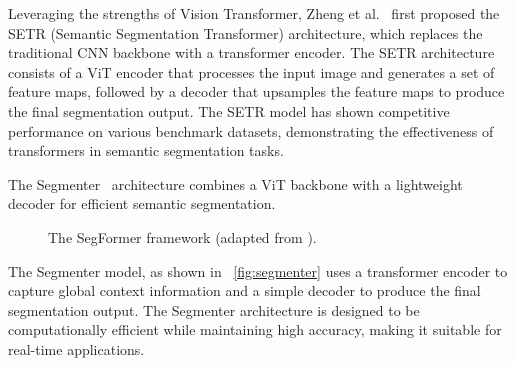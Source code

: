 Leveraging the strengths of Vision Transformer, Zheng et al.~\cite{fsss_setr} first proposed the SETR (Semantic Segmentation Transformer) architecture, which replaces the traditional CNN backbone with a transformer encoder. The SETR architecture consists of a ViT encoder that processes the input image and generates a set of feature maps, followed by a decoder that upsamples the feature maps to produce the final segmentation output. The SETR model has shown competitive performance on various benchmark datasets, demonstrating the effectiveness of transformers in semantic segmentation tasks.

The Segmenter~\cite{fsss_segmenter} architecture combines a ViT backbone with a lightweight decoder for efficient semantic segmentation. 
\begin{figure}[htbp]
    \centering
    \caption{The SegFormer framework (adapted from \cite{fsss_segmenter}).}
    \label{fig:segmenter}
\end{figure}

The Segmenter model, as shown in ~\autoref{fig:segmenter} uses a transformer encoder to capture global context information and a simple decoder to produce the final segmentation output. The Segmenter architecture is designed to be computationally efficient while maintaining high accuracy, making it suitable for real-time applications.


